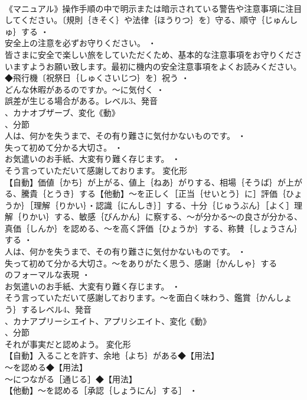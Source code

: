 \documentclass[8pt]{extreport}
\begin{document}
\begin{CJK}{UTF8}{min}
\\	《マニュアル》操作手順の中で明示または暗示されている警告や注意事項に注目してください。〔規則｛きそく｝や法律｛ほうりつ｝を〕守る、順守｛じゅんしゅ｝する ・
\\	安全上の注意を必ずお守りください。 ・
\\	皆さまに安全で楽しい旅をしていただくため、基本的な注意事項をお守りくださいますようお願い致します。最初に機内の安全注意事項をよくお読みください。◆飛行機〔祝祭日｛しゅくさいじつ｝を〕祝う ・
\\	どんな休暇があるのですか。～に気付く ・
\\	誤差が生じる場合がある。レベル3、発音
\\	、カナオブザーブ、変化《動》
\\	、分節
\\	人は、何かを失うまで、その有り難さに気付かないものです。 ・
\\	失って初めて分かる大切さ。 ・
\\	お気遣いのお手紙、大変有り難く存じます。 ・
\\	そう言っていただいて感謝しております。	変化形 
\\	【自動】価値｛かち｝が上がる、値上｛ねあ｝がりする、相場｛そうば｝が上がる、騰貴｛とうき｝する【他動】～を正しく［正当｛せいとう｝に］評価｛ひょうか｝［理解｛りかい｝・認識｛にんしき｝］する、十分｛じゅうぶん｝［よく］理解｛りかい｝する、敏感｛びんかん｝に察する、～が分かる～の良さが分かる、真価｛しんか｝を認める、～を高く評価｛ひょうか｝する、称賛｛しょうさん｝する ・
\\	人は、何かを失うまで、その有り難さに気付かないものです。 ・
\\	失って初めて分かる大切さ。～をありがたく思う、感謝｛かんしゃ｝する
\\	のフォーマルな表現 ・
\\	お気遣いのお手紙、大変有り難く存じます。 ・
\\	そう言っていただいて感謝しております。～を面白く味わう、鑑賞｛かんしょう｝するレベル4、発音
\\	、カナアプリーシエイト、アプリシエイト、変化《動》
\\	、分節
\\	それが事実だと認めよう。	変化形 
\\	【自動】入ることを許す、余地｛よち｝がある◆【用法】
\\	～を認める◆【用法】
\\	～につながる［通じる］◆【用法】
\\	【他動】～を認める［承認｛しょうにん｝する］ ・

\end{CJK}
\end{document}

